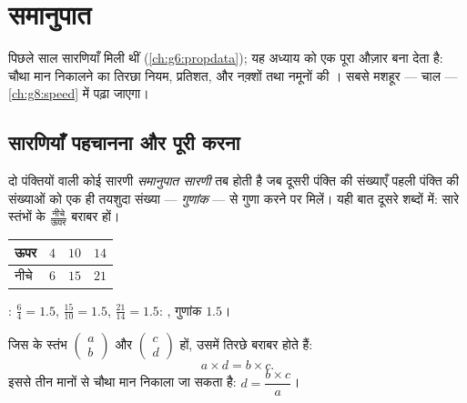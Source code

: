 \chapter{समानुपात}\label{ch:g7:prop}

पिछले साल  सारणियाँ मिली थीं (\cref{ch:g6:propdata}); यह
अध्याय  को एक पूरा औज़ार बना देता है: चौथा मान निकालने का
तिरछा नियम, प्रतिशत, और नक़्शों तथा नमूनों की । सबसे मशहूर
 --- चाल --- \cref{ch:g8:speed} में पढ़ा जाएगा।

\section{सारणियाँ पहचानना और पूरी करना}

\begin{definition}[समानुपात सारणी]\label{def:g7:prop:table}
दो पंक्तियों वाली कोई सारणी \emph{समानुपात सारणी}
तब होती है जब दूसरी पंक्ति की संख्याएँ पहली पंक्ति की संख्याओं को
एक ही तयशुदा संख्या --- \emph{गुणांक} --- से गुणा करने पर मिलें।
यही बात दूसरे शब्दों में: सारे स्तंभों के 
$\frac{\text{नीचे}}{\text{ऊपर}}$ बराबर हों।
\end{definition}

\begin{example}\label{ex:g7:prop:recognize}
\begin{center}
\renewcommand{\arraystretch}{1.3}
\begin{tabular}{l|ccc}
ऊपर & $4$ & $10$ & $14$ \\
\hline
नीचे & $6$ & $15$ & $21$ \\
\end{tabular}
\end{center}
: $\frac64 = 1.5$, $\frac{15}{10} = 1.5$,
$\frac{21}{14} = 1.5$: , गुणांक $1.5$।
\end{example}

\begin{theorem}[तिरछा नियम]\label{thm:g7:prop:cross}
जिस  के स्तंभ $\begin{pmatrix} a \\ b
\end{pmatrix}$ और $\begin{pmatrix} c \\ d \end{pmatrix}$ हों, उसमें
तिरछे  बराबर होते हैं:
\[
a \times d = b \times c .
\]
इससे तीन मानों से चौथा मान निकाला जा सकता है:
$d = \dfrac{b \times c}{a}$।
\end{theorem}

